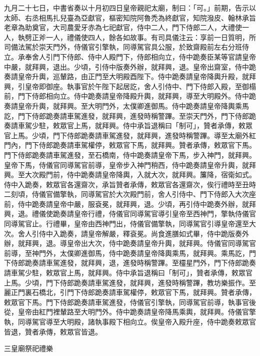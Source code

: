 \begin{pinyinscope}
 九月二十七日，中書省奏以十月初四日皇帝親祀太廟，制曰：「可。」前期，告示以太師、右丞相馬扎兒臺為亞獻官，樞密知院阿魯禿為終獻官，知院潑皮、翰林承旨老章為助奠官，大司農愛牙赤為七祀獻官，侍中二人，門下侍郎二人，大禮使一人，執劈正斧一人，禮儀使四人，餘各如故事。有司具儀注云：享前一日質明，所司備法駕於崇天門外，侍儀官引擎執，同導駕官具公服，於致齋殿前左右分班侍立。承奉舍人引門下侍郎、侍中人殿門下，侍郎相向立，侍中跪奏臣某等官請皇帝中嚴，就拜興，退出。少頃，引侍中版奏外辦，就拜興，退。皇帝出齋室，侍中跪奏請皇帝升輿，巡輦路，由正門至大明殿酉陛下。侍中跪奏請皇帝降輿升殿，就拜興，引皇帝即御座。執事官於午陛下起居訖，舍人引侍中、門下侍郎入殿，至御榻前，門下侍郎相向立。侍中跪奏請皇帝降殿升輿，就拜興，導至大明殿外。侍中跪奏請皇帝升輿，就拜興。至大明門外，太僕卿進御馬。侍中跪奏請皇帝降輿乘馬訖，門下侍郎跪奏請車駕進發，就拜興，進發時稱警蹕。至崇天門外，門下侍郎跪奏請車駕少駐，敕眾官上馬，就拜興。侍中承旨退稱曰「制可」，贊者承傳，敕眾官上馬。少頃，門下侍郎跪奏請車駕進發，就拜興，進發時稱警蹕。導至太廟外紅門內，門下侍郎跪奏請車駕權停，敕眾官下馬，就拜興。贊者承傳，敕眾官下馬。門下侍郎跪奏請車駕進發，至石橋南，侍中跪奏請皇帝下馬，步入神門，就拜興。皇帝下馬，侍儀官同導駕官前導，皇帝步入神門稍西，侍中跪奏請皇帝升輿，就拜興。至大次殿門前，侍中跪奏請皇帝降輿，入就大次，就拜興。簾降，宿衛如式。侍中入跪奏，敕眾官各還齋次，承旨贊者承傳，敕眾官各還齋次，俟行禮時至丑時二刻頃，侍儀官備擎執，同導駕官於大次殿門前，舍人引侍中、門下侍郎入大次座前，侍中跪奏請皇帝中嚴，服袞冕，就拜興，退。少頃，再引侍中跪奏外辦，就拜興，退。禮儀使跪奏請皇帝行禮，侍儀官同導駕官導引皇帝至西神門，擎執侍儀官同導駕官止。行禮畢，皇帝由西神門出，侍儀官備擎執，同導駕官引導皇帝還至大次。舍人引侍中入跪奏，請皇帝解嚴，釋袞冕。尚食進膳如式畢，侍中跪版奏外辦，就拜興，退。導皇帝出大次，侍中跪奏請皇帝升輿，就拜興。侍儀官同導駕官前導，至神門外，太僕卿進御馬，侍中跪奏請皇帝降輿乘馬，就拜興。乘馬訖，門下侍郎跪奏請車駕進發，就拜興，退，進發時稱警蹕。至欞星門外，門下侍郎跪奏請車駕少駐，敕眾官上馬，就拜興。侍中承旨退稱曰「制可」，贊者承傳，敕眾官上馬。少頃，門下侍郎跪奏請車駕進發，就拜興，進發時稱警蹕，教坊樂振作。至麗正門裏石橋北，引門下侍郎跪奏請車駕權停，敕眾官下馬，就拜興。贊者承傳，敕眾官下馬。門下侍郎跪奏請車駕進發，侍儀官引擎執，同導駕官前導，執事官後從，皇帝由紅門裡輦路至大明門外。侍中跪奏請皇帝降馬乘輿，就拜興。侍儀官擎執，同導駕官導至大明殿，諸執事殿下相向立。俟皇帝入殿升座，侍中跪奏敕眾官皆退，贊者承傳，敕眾官皆退。



 三皇廟祭祀禮樂




\end{pinyinscope}
